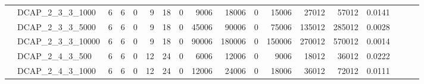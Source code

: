\begin{landscape}
\begin{longtable}[c]{llrrrrrrrrrrrrrlll}
		& DCAP\_2\_3\_3\_1000          & 6                           & 6                          & 0                          & 9                           & 18                         & 0                          & 9006                       & 18006                     & 0                         & 15006                      & 27012                      & 57012                          & 0.0141                        &                          &                          &                          \\
		& DCAP\_2\_3\_3\_5000          & 6                           & 6                          & 0                          & 9                           & 18                         & 0                          & 45006                      & 90006                     & 0                         & 75006                      & 135012                     & 285012                         & 0.0028                        &                          &                          &                          \\
		& DCAP\_2\_3\_3\_10000         & 6                           & 6                          & 0                          & 9                           & 18                         & 0                          & 90006                      & 180006                    & 0                         & 150006                     & 270012                     & 570012                         & 0.0014                        &                          &                          &                          \\
		& DCAP\_2\_4\_3\_500           & 6                           & 6                          & 0                          & 12                          & 24                         & 0                          & 6006                       & 12006                     & 0                         & 9006                       & 18012                      & 36012                          & 0.0222                        &                          &                          &                          \\
		& DCAP\_2\_4\_3\_1000          & 6                           & 6                          & 0                          & 12                          & 24                         & 0                          & 12006                      & 24006                     & 0                         & 18006                      & 36012                      & 72012                          & 0.0111                        &                          &                          &                          \\

\end{longtable}
\end{landscape}
